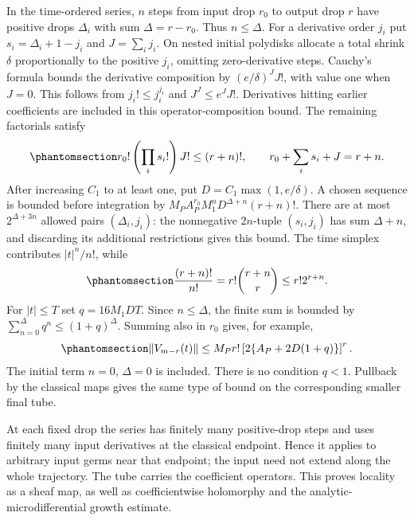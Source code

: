 \documentclass[
  english,
  11pt,
  reqno]{amsart}
\begin{document}
In the time-ordered series, \(n\) steps from input drop \(r_0\) to
output drop \(r\) have positive drops \(\Delta_i\) with sum
\(\Delta=r-r_0\). Thus \(n\le\Delta\). For a derivative order \(j_i\)
put \(s_i=\Delta_i+1-j_i\) and \(J=\sum_i j_i\). On nested initial
polydisks allocate a total shrink \(\delta\) proportionally to the
positive \(j_i\), omitting zero-derivative steps. Cauchy's formula
bounds the derivative composition by \((e/\delta)^J J!\), with value one
when \(J=0\). This follows from \(j_i!\le j_i^{j_i}\) and
\(J^J\le e^JJ!\). Derivatives hitting earlier coefficients are included
in this operator-composition bound. The remaining factorials satisfy
\begin{equation}\protect\phantomsection\label{eq:gg-op-flow-factorial-budget}{
 r_0!\left(\prod_i s_i!\right)J!\le(r+n)!,
 \qquad
 r_0+\sum_i s_i+J=r+n .
}\end{equation} After increasing \(C_1\) to at least one, put
\(D=C_1\max(1,e/\delta)\). A chosen sequence is bounded before
integration by \(M_PA_P^{r_0}M_1^nD^{\Delta+n}(r+n)!\). There are at
most \(2^{\Delta+3n}\) allowed pairs \((\Delta_i,j_i)\): the nonnegative
\(2n\)-tuple \((s_i,j_i)\) has sum \(\Delta+n\), and discarding its
additional restrictions gives this bound. The time simplex contributes
\(|t|^n/n!\), while
\begin{equation}\protect\phantomsection\label{eq:gg-op-flow-time-budget}{
 \frac{(r+n)!}{n!}
   =r!\binom{r+n}{r}\le r!2^{r+n}.
}\end{equation} For \(|t|\le T\) set \(q=16M_1DT\). Since
\(n\le\Delta\), the finite sum is bounded by
\(\sum_{n=0}^{\Delta}q^n\le(1+q)^\Delta\). Summing also in \(r_0\)
gives, for example,
\begin{equation}\protect\phantomsection\label{eq:gg-op-flow-output-bound}{
 \|V_{m-r}(t)\|
 \le M_Pr!\left[2\{A_P+2D(1+q)\}\right]^r .
}\end{equation} The initial term \(n=0\), \(\Delta=0\) is included.
There is no condition \(q<1\). Pullback by the classical maps gives the
same type of bound on the corresponding smaller final tube.

At each fixed drop the series has finitely many positive-drop steps and
uses finitely many input derivatives at the classical endpoint. Hence it
applies to arbitrary input germs near that endpoint; the input need not
extend along the whole trajectory. The tube carries the coefficient
operators. This proves locality as a sheaf map, as well as
coefficientwise holomorphy and the analytic-microdifferential growth
estimate.
\end{document}

